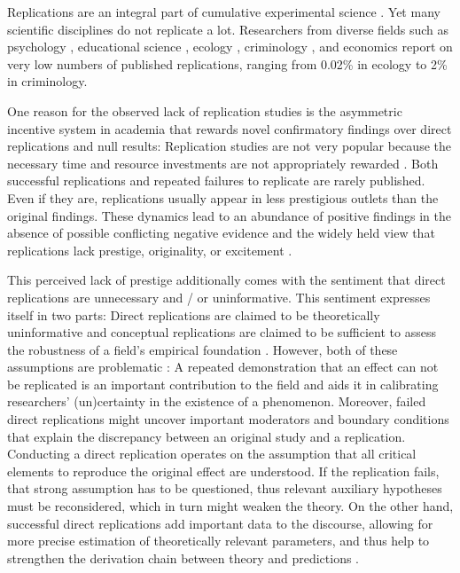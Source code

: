 \documentclass[cm,linguex]{glossa}
\begin{document}
Replications are an integral part of cumulative experimental science \citep[e.g.,][]{campbell_reforms_1969, rosenthal_replication_1990, zwaan_making_2018}. Yet many scientific disciplines do not replicate a lot. Researchers from diverse fields such as psychology \citep{makel_replications_2012}, educational science \citep{makel_facts_2014}, ecology \citep{kelly2019rate}, criminology \citep{mcneeley2015replication}, and economics \citep{mueller2019replication} report on very low numbers of published replications, ranging from 0.02\% in ecology to 2\% in criminology.

One reason for the observed lack of replication studies is the asymmetric incentive system in academia that rewards novel confirmatory findings over direct replications and null results: Replication studies are not very popular because the necessary time and resource investments are not appropriately rewarded \citep[e.g.,][]{koole_rewarding_2012, nosek_scientific_2012}. Both successful replications \citep{madden_how_1995} and repeated failures to replicate \citep[e.g.,][]{doyen_behavioral_2012} are rarely published. Even if they are, replications usually appear in less prestigious outlets than the original findings. These dynamics lead to an abundance of positive findings in the absence of possible conflicting negative evidence \citep[see also][]{fanelli_pressures_2010} and the widely held view that replications lack prestige, originality, or excitement \citep[e.g.,][]{lindsay1993design}.

This perceived lack of prestige additionally comes with the sentiment that direct replications are unnecessary and / or uninformative.
This sentiment expresses itself in two parts: Direct replications are claimed to be theoretically uninformative and conceptual replications are claimed to be sufficient to assess the robustness of a field's empirical foundation \citep[e.g.,][]{stroebe2014alleged, crandall2016scientific}.
However, both of these assumptions are problematic \citep[e.g.,][]{zwaan_making_2018}:
A repeated demonstration that an effect can not be replicated is an important contribution to the field and aids it in calibrating researchers' (un)certainty in the existence of a phenomenon.
Moreover, failed direct replications might uncover important moderators and boundary conditions that explain the discrepancy between an original study and a replication.
Conducting a direct replication operates on the assumption that all critical elements to reproduce the original effect are understood.
If the replication fails, that strong assumption has to be questioned, thus relevant auxiliary hypotheses must be reconsidered, which in turn might weaken the theory.
On the other hand, successful direct replications add important data to the discourse, allowing for more precise estimation of theoretically relevant parameters, and thus help to strengthen the derivation chain between theory and predictions \citep{meehl1990summaries}.
\end{document}
